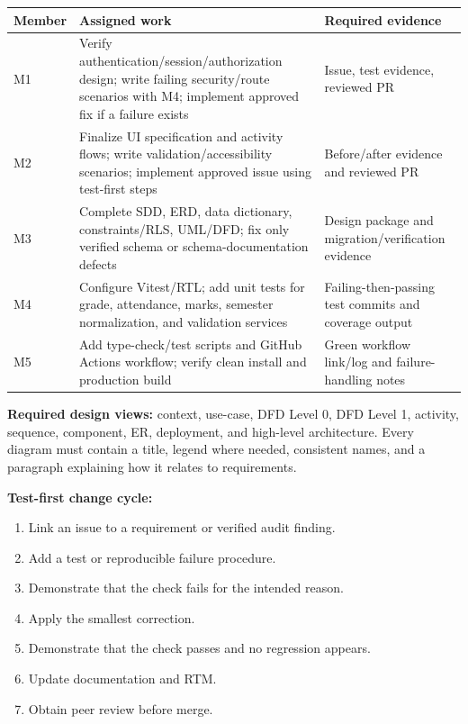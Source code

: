 \documentclass[
  10pt,
  a4paper,
  oneside]{report}
\newcounter{none} %
\providecommand{\tightlist}{%
  \setlength{\itemsep}{0pt}\setlength{\parskip}{0pt}}
\begin{document}
{\def\LTcaptype{none} %
\begin{longtable}[]{@{}
  >{\raggedright\arraybackslash}p{}
  >{\raggedright\arraybackslash}p{}
  >{\raggedright\arraybackslash}p{}@{}}
\toprule\noalign{}
\begin{minipage}[b]{\linewidth}\raggedright
Member
\end{minipage} & \begin{minipage}[b]{\linewidth}\raggedright
Assigned work
\end{minipage} & \begin{minipage}[b]{\linewidth}\raggedright
Required evidence
\end{minipage} \\
\midrule\noalign{}
\endhead
\bottomrule\noalign{}
\endlastfoot
M1 & Verify authentication/session/authorization design; write failing
security/route scenarios with M4; implement approved fix if a failure
exists & Issue, test evidence, reviewed PR \\
M2 & Finalize UI specification and activity flows; write
validation/accessibility scenarios; implement approved issue using
test-first steps & Before/after evidence and reviewed PR \\
M3 & Complete SDD, ERD, data dictionary, constraints/RLS, UML/DFD; fix
only verified schema or schema-documentation defects & Design package
and migration/verification evidence \\
M4 & Configure Vitest/RTL; add unit tests for grade, attendance, marks,
semester normalization, and validation services & Failing-then-passing
test commits and coverage output \\
M5 & Add type-check/test scripts and GitHub Actions workflow; verify
clean install and production build & Green workflow link/log and
failure-handling notes \\
\end{longtable}
}

\textbf{Required design views:} context, use-case, DFD Level 0, DFD
Level 1, activity, sequence, component, ER, deployment, and high-level
architecture. Every diagram must contain a title, legend where needed,
consistent names, and a paragraph explaining how it relates to
requirements.

\textbf{Test-first change cycle:}

\begin{enumerate}
\def\labelenumi{\arabic{enumi}.}
\tightlist
\item
  Link an issue to a requirement or verified audit finding.
\item
  Add a test or reproducible failure procedure.
\item
  Demonstrate that the check fails for the intended reason.
\item
  Apply the smallest correction.
\item
  Demonstrate that the check passes and no regression appears.
\item
  Update documentation and RTM.
\item
  Obtain peer review before merge.
\end{enumerate}
\end{document}
